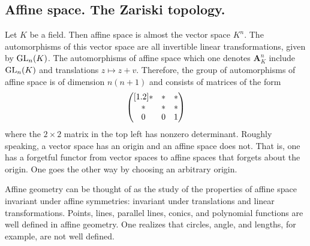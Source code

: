 \documentclass [11 pt, oneside] {article}
\begin{document}
\subsection{Affine space. The Zariski topology.}
Let $K$ be a field. Then affine space is almost the vector space $K^n$. The automorphisms of this vector space are all invertible linear transformations, given by $\operatorname{GL}_{n}(K)$. The automorphisms of affine space which one denotes $\mathbf{A}^n_K$ include $\operatorname{GL}_{n}(K)$ and translations $z \longmapsto z+v$. Therefore, the group of automorphisms of affine space is of dimension $n(n+1)$ and consists of matrices of the form
\begin{align*}
	\begin{pmatrix} [1.2] *&*&*\\ \text{}*&*&*\\0&0&1\end{pmatrix}
\end{align*}
where the $2\times 2$ matrix in the top left has nonzero determinant. Roughly speaking, a vector space has an origin and an affine space does not. That is, one has a forgetful functor from vector spaces to affine spaces that forgets about the origin. One goes the other way by choosing an arbitrary origin. 

Affine geometry can be thought of as the study of the properties of affine space invariant under affine symmetries: invariant under translations and linear transformations. Points, lines, parallel lines, conics, and polynomial functions are well defined in affine geometry. One realizes that circles, angle, and lengths, for example, are not well defined.
\end{document}
